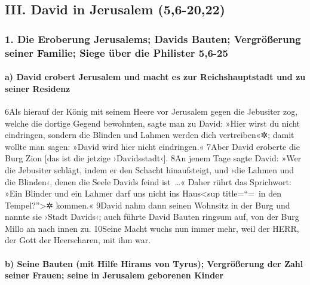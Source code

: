 \hypertarget{iii.-david-in-jerusalem-56-2022}{%
\subsection{III. David in Jerusalem
(5,6-20,22)}\label{iii.-david-in-jerusalem-56-2022}}

\hypertarget{die-eroberung-jerusalems-davids-bauten-vergruxf6uxdferung-seiner-familie-siege-uxfcber-die-philister-56-25}{%
\subsubsection{1. Die Eroberung Jerusalems; Davids Bauten; Vergrößerung
seiner Familie; Siege über die Philister
5,6-25}\label{die-eroberung-jerusalems-davids-bauten-vergruxf6uxdferung-seiner-familie-siege-uxfcber-die-philister-56-25}}

\hypertarget{a-david-erobert-jerusalem-und-macht-es-zur-reichshauptstadt-und-zu-seiner-residenz}{%
\paragraph{a) David erobert Jerusalem und macht es zur Reichshauptstadt
und zu seiner
Residenz}\label{a-david-erobert-jerusalem-und-macht-es-zur-reichshauptstadt-und-zu-seiner-residenz}}

6Als hierauf der König mit seinem Heere vor Jerusalem gegen die
Jebusiter zog, welche die dortige Gegend bewohnten, sagte man zu David:
»Hier wirst du nicht eindringen, sondern die Blinden und Lahmen werden
dich vertreiben«✲; damit wollte man sagen: »David wird hier nicht
eindringen.« 7Aber David eroberte die Burg Zion {[}das ist die jetzige
›Davidsstadt‹{]}. 8An jenem Tage sagte David: »Wer die Jebusiter
schlägt, indem er den Schacht hinaufsteigt, und ›die Lahmen und die
Blinden‹, denen die Seele Davids feind ist~\ldots« Daher rührt das
Sprichwort: »Ein Blinder und ein Lahmer darf uns nicht ins
Haus\textless sup title=``=~in den Tempel?''\textgreater✲ kommen.«
9David nahm dann seinen Wohnsitz in der Burg und nannte sie ›Stadt
Davids‹; auch führte David Bauten ringsum auf, von der Burg Millo an
nach innen zu. 10Seine Macht wuchs nun immer mehr, weil der HERR, der
Gott der Heerscharen, mit ihm war.

\hypertarget{b-seine-bauten-mit-hilfe-hirams-von-tyrus-vergruxf6uxdferung-der-zahl-seiner-frauen-seine-in-jerusalem-geborenen-kinder}{%
\paragraph{b) Seine Bauten (mit Hilfe Hirams von Tyrus); Vergrößerung
der Zahl seiner Frauen; seine in Jerusalem geborenen
Kinder}\label{b-seine-bauten-mit-hilfe-hirams-von-tyrus-vergruxf6uxdferung-der-zahl-seiner-frauen-seine-in-jerusalem-geborenen-kinder}}

